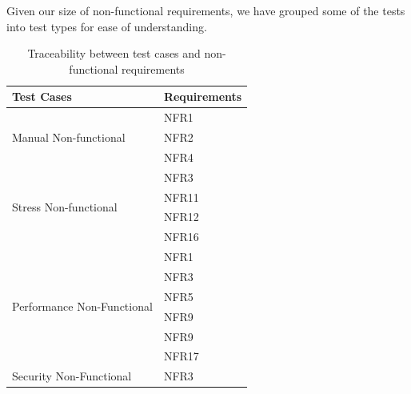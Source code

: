 \documentclass[12pt, titlepage]{article}
\begin{document}
\noindent Given our size of non-functional requirements, we have grouped some of the tests into test types for ease of understanding.
\begin{table}[H]
  \centering
  \begin{tabular}{|l|l|}
  \hline
  \textbf{Test Cases}                         & \textbf{Requirements} \\ \hline
  \multirow{3}{*}{Manual Non-functional}      & NFR1                  \\ \cline{2-2} 
                                              & NFR2                  \\ \cline{2-2} 
                                              & NFR4                  \\ \hline
  \multirow{4}{*}{Stress Non-functional}      & NFR3                  \\ \cline{2-2} 
                                              & NFR11                 \\ \cline{2-2} 
                                              & NFR12                 \\ \cline{2-2} 
                                              & NFR16                 \\ \hline
  \multirow{6}{*}{Performance Non-Functional} & NFR1                  \\ \cline{2-2} 
                                              & NFR3                  \\ \cline{2-2} 
                                              & NFR5                  \\ \cline{2-2} 
                                              & NFR9                  \\ \cline{2-2} 
                                              & NFR9                  \\ \cline{2-2} 
                                              & NFR17                 \\ \hline
  Security Non-Functional                                   & NFR3                  \\ \hline
  \end{tabular}
  \caption{Traceability between test cases and non-functional requirements }
  \label{tab:my-table}
\end{table}
\end{document}
